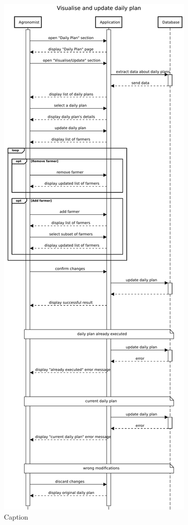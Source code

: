 \begin{figure}[H]
    \centering
    \includegraphics[scale=0.45]{Images/Sequence diagrams/Agronomist - visualise and update daily plan.pdf}
    \caption{Caption}
    \label{fig:fig:seq_diag_update_daily_plan}
\end{figure}

